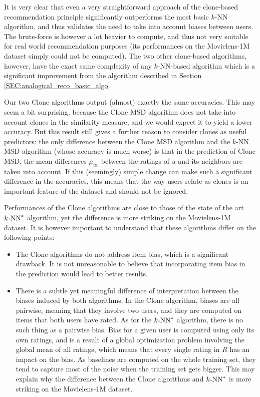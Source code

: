 It is very clear that even a very straightforward approach of the clone-based
recommendation principle significantly outperforms the most basic $k$-NN
algorithm, and thus validates the need to take into account biases between
users. The brute-force is however a lot heavier to compute, and thus not very
suitable for real world recommendation purposes (its performances on the
Movielens-1M dataset simply could not be computed). The two other clone-based
algorithms, however, have the exact same complexity of any $k$-NN-based
algorithm which is a significant improvement from the algorithm described in
Section \ref{SEC:analogical_reco_basic_algo}.

Our two Clone algorithms output (almost) exactly the same
accuracies. This may seem a bit surprising, because the Clone MSD algorithm
does not take into account clones in the similarity measure, and we would
expect it to yield a lower accuracy. But this result still gives a further
reason to consider clones as useful predictors: the only difference between the
Clone MSD algorithm and the $k$-NN MSD algorithm (whose accuracy is much worse)
is that in the prediction of Clone MSD, the mean differences $\mu_{uv}$ between
the ratings of $u$ and its neighbors are taken into account. If this
(seemingly) simple change can make such a significant difference in the
accuracies, this means that the way users relate as clones is an important
feature of the dataset and should not be ignored.

Performances of the Clone algorithms are close to those of the state of the
art $k\text{-NN}^*$ algorithm, yet the difference is more striking on the Movielens-1M
dataset. It is however important to understand that these algorithms differ on
the following points:
\begin{itemize}
\item The Clone algorithms do not address item bias, which is a significant
  drawback. It is not unreasonable to believe that incorporating item bias
  in the prediction would lead to better results.
\item There is a subtle yet meaningful difference of interpretation between the
  biases induced by both algorithms. In the Clone algorithm, biases are all
  pairwise, meaning that they involve two users, and they are computed on items
  that both users have rated. As for the $k\text{-NN}^*$ algorithm, there is no such
  thing as a pairwise bias. Bias for a given user is computed using only its
  own ratings, and is a result of a global optimization problem involving the
  global mean of all ratings, which means that every single rating in $R$ has
  an impact on the bias. As baselines are computed on the whole training set,
    they tend to capture most of the noise when the training set gets bigger.
    This may explain why the difference between the Clone algorithms and
    $k\text{-NN}^*$ is more striking on the Movielens-1M dataset.
\end{itemize}

